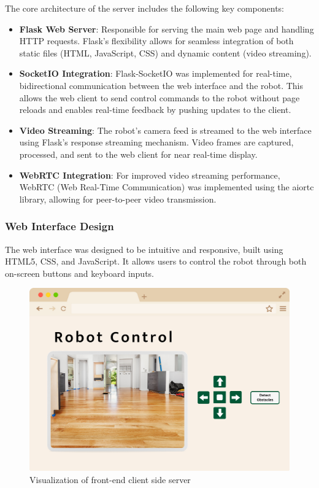 The core architecture of the server includes the following key components:
\begin{itemize}
	\item \textbf{Flask Web Server}: Responsible for serving the main web page and handling HTTP requests. Flask's flexibility allows for seamless integration of both static files (HTML, JavaScript, CSS) and dynamic content (video streaming).
	\item \textbf{SocketIO Integration}: Flask-SocketIO was implemented for real-time, bidirectional communication between the web interface and the robot. This allows the web client to send control commands to the robot without page reloads and enables real-time feedback by pushing updates to the client.
	\item \textbf{Video Streaming}: The robot's camera feed is streamed to the web interface using Flask's response streaming mechanism. Video frames are captured, processed, and sent to the web client for near real-time display.
	\item \textbf{WebRTC Integration}: For improved video streaming performance, WebRTC (Web Real-Time Communication) was implemented using the aiortc library, allowing for peer-to-peer video transmission.
\end{itemize}

\subsubsection{Web Interface Design}
The web interface was designed to be intuitive and responsive, built using HTML5, CSS, and JavaScript. It allows users to control the robot through both on-screen buttons and keyboard inputs.

\begin{figure}[H]
	\centering
	\includegraphics[width=0.7\linewidth]{ch4/figs/website}
	\caption{Visualization of front-end client side server}
	\label{fig:website}
\end{figure}

